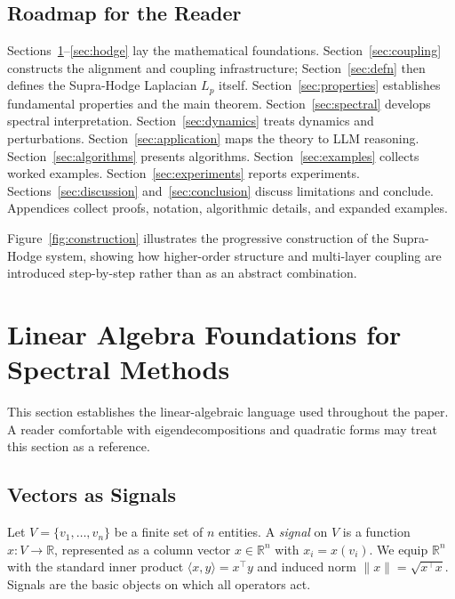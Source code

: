 \documentclass[11pt]{article}
\theoremstyle{definition}
\theoremstyle{remark}
\newcommand{\R}{\mathbb{R}}
\begin{document}
\subsection{Roadmap for the Reader}

Sections~\ref{sec:linalg}--\ref{sec:hodge} lay the mathematical foundations.
Section~\ref{sec:coupling} constructs the alignment and coupling infrastructure;
Section~\ref{sec:defn} then defines the Supra-Hodge Laplacian $L_p$ itself.
Section~\ref{sec:properties} establishes fundamental properties and the main
theorem. Section~\ref{sec:spectral} develops spectral interpretation.
Section~\ref{sec:dynamics} treats dynamics and perturbations.
Section~\ref{sec:application} maps the theory to LLM reasoning.
Section~\ref{sec:algorithms} presents algorithms. Section~\ref{sec:examples}
collects worked examples. Section~\ref{sec:experiments} reports experiments.
Sections~\ref{sec:discussion} and~\ref{sec:conclusion} discuss limitations and
conclude. Appendices collect proofs, notation, algorithmic details, and expanded
examples.

Figure~\ref{fig:construction} illustrates the progressive construction of the
Supra-Hodge system, showing how higher-order structure and multi-layer coupling
are introduced step-by-step rather than as an abstract combination.


\FigureAOne


\section{Linear Algebra Foundations for Spectral Methods}
\label{sec:linalg}

This section establishes the linear-algebraic language used throughout the
paper. A reader comfortable with eigendecompositions and quadratic forms may
treat this section as a reference.

\subsection{Vectors as Signals}

Let $V = \{v_1,\dots,v_n\}$ be a finite set of $n$ entities. A \emph{signal}
on $V$ is a function $x\colon V \to \R$, represented as a column vector
$x \in \R^n$ with $x_i = x(v_i)$. We equip $\R^n$ with the standard inner
product $\langle x, y\rangle = x^\top y$ and induced norm $\|x\| =
\sqrt{x^\top x}$. Signals are the basic objects on which all operators act.
\end{document}
